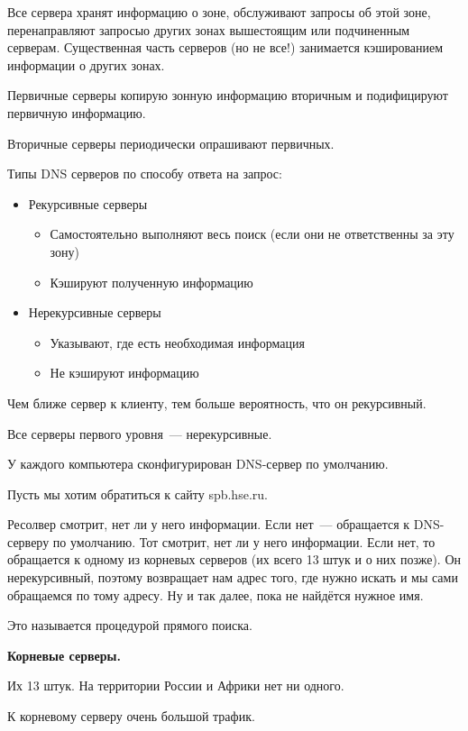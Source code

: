 Все сервера хранят информацию о зоне, обслуживают запросы об этой зоне, перенаправляют запросыо  других зонах вышестоящим или подчиненным серверам. Существенная часть серверов (но не все!) занимается кэшированием информации о других зонах.

Первичные серверы копирую зонную информацию вторичным и подифицируют первичную информацию.

Вторичные серверы периодически опрашивают первичных.

Типы DNS серверов по способу ответа на запрос:
\begin{itemize}
    \item Рекурсивные серверы
    \begin{itemize}
        \item Самостоятельно выполняют весь поиск (если они не ответственны за эту зону)
        \item Кэшируют полученную информацию
    \end{itemize}
    \item Нерекурсивные серверы
    \begin{itemize}
        \item Указывают, где есть необходимая информация
        \item Не кэшируют информацию
    \end{itemize}
\end{itemize}

Чем ближе сервер к клиенту, тем больше вероятность, что он рекурсивный.

Все серверы первого уровня~--- нерекурсивные.

У каждого компьютера сконфигурирован DNS-сервер по умолчанию.

Пусть мы хотим обратиться к сайту spb.hse.ru.

Ресолвер смотрит, нет ли у него информации. Если нет~--- обращается к DNS-серверу по умолчанию. Тот смотрит, нет ли у него информации. Если нет, то обращается к одному из корневых серверов (их всего 13 штук и о них позже). Он нерекурсивный, поэтому возвращает нам адрес того, где нужно искать и мы сами обращаемся по тому адресу. Ну и так далее, пока не найдётся нужное имя.

Это называется процедурой прямого поиска.

{\bf Корневые серверы.}

Их 13 штук. На территории России и Африки нет ни одного.

К корневому серверу очень большой трафик.


